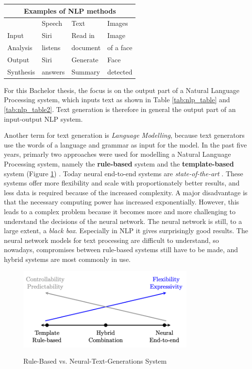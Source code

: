 \begin{center} 
	\begin{tabular}{ |p{3cm}||p{3cm}|p{3cm}|p{3cm}|}
		\hline
		\multicolumn{4}{|c|}{\textbf{Examples of NLP methods}}\\ \hline\hline
		&Speech &Text &Images \\ \hline
		Input &Siri &Read in &Image \\
		Analysis &listens  &document     &of a face \\ \hline \hline
		Output &Siri &\cellcolor[HTML]{F3E687}Generate &Face \\
		Synthesis &answers & \cellcolor[HTML]{F3E687}Summary &detected \\ \hline
	\end{tabular}
	\label{tab:nlp_table2}
\end{center}

For this Bachelor thesis, the focus is on the output part of a Natural Language Processing system, which inputs text as shown in Table \ref{tab:nlp_table} and \ref{tab:nlp_table2}. Text generation is therefore in general the output part of an input-output NLP system.

Another term for text generation is  \textit{Language Modelling}, because text generators use the words of a language and grammar as input for the model. In the past five years, primarly two approaches were used for modelling a Natural Language Processing system, namely the \textbf{rule-based} system and the \textbf{template-based} system (Figure \ref{rules_based}) \cite{NTG2}. Today neural end-to-end systems are \textit{state-of-the-art} \cite{End_to_End}. These systems offer more flexibility and scale with proportionately better results, and less data is required because of the increased complexity. A major disadvantage is that the necessary computing power has increased exponentially. However, this leads to a complex problem because it becomes more and more challenging to understand the decisions of the neural network. The neural network is still, to a large extent, a \textit{black box}. Especially in NLP it gives surprisingly good results. The neural network models for text processing are difficult to understand, so nowadays, compromises between rule-based systems still have to be made, and hybrid systems are most commonly in use. 


\begin{figure}
  \begin{center}
  \includegraphics[width=3.5in]{photos/rule_based}\\
  \caption{Rule-Based vs. Neural-Text-Generations System \cite{NTG2}}\label{rules_based}
  \end{center}
\end{figure}

